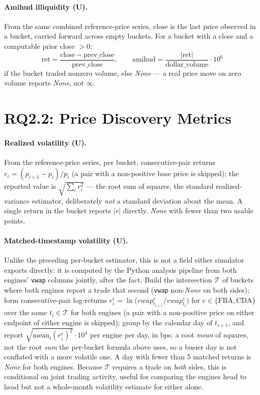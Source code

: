 \paragraph{Amihud illiquidity (U).} From the same combined reference-price
series, $\mathrm{close}$ is the last price observed in a bucket, carried
forward across empty buckets. For a bucket with a close and a computable
prior close $>0$:
\begin{equation}
  \mathrm{ret} = \frac{\mathrm{close}-\mathrm{prev\_close}}{\mathrm{prev\_close}},
  \qquad
  \mathrm{amihud} = \frac{|\mathrm{ret}|}{\mathrm{dollar\_volume}} \cdot 10^{6}
\end{equation}
if the bucket traded nonzero volume, else \emph{None} --- a real price
move on zero volume reports \emph{None}, not $\infty$.

\section{RQ2.2: Price Discovery Metrics}
\label{sec:formularq22}

\paragraph{Realized volatility (U).} From the reference-price series,
per bucket, consecutive-pair returns $r_i = (p_{i+1}-p_i)/p_i$
(a pair with a non-positive base price is skipped); the reported value
is $\sqrt{\sum_i r_i^2}$ --- the root sum of squares, the standard
realized-variance estimator, deliberately \emph{not} a standard
deviation about the mean. A single return in the bucket reports
$|r|$ directly. \emph{None} with fewer than two usable points.

\paragraph{Matched-timestamp volatility (U).} Unlike the preceding
per-bucket estimator, this is not a field either simulator exports
directly: it is computed by the Python analysis pipeline
from both engines' \texttt{vwap}
columns jointly, after the fact. Build the intersection $\mathcal{T}$ of
buckets where both engines report a trade that second (\texttt{vwap}
non-\emph{None} on both sides); form consecutive-pair log-returns
$r^{e}_i = \ln\!\big(vwap^{e}_{t_{i+1}}/vwap^{e}_{t_i}\big)$ for
$e \in \{\text{FBA}, \text{CDA}\}$ over the same $t_i \in \mathcal{T}$ for
both engines (a pair with a non-positive price on either endpoint of
either engine is skipped); group by the calendar day of $t_{i+1}$, and
report $\sqrt{\mathrm{mean}_i(r^{e}_i)^2} \cdot 10^{4}$ per engine per
day, in bps: a root \emph{mean} of squares, not the root \emph{sum} the
per-bucket formula above uses, so a busier day is not conflated with a
more volatile one. A day with fewer than 5 matched returns is
\emph{None} for both engines. Because $\mathcal{T}$ requires a trade on
\emph{both} sides, this is conditional on joint trading activity, useful
for comparing the engines head to head but not a whole-month volatility
estimate for either alone.

